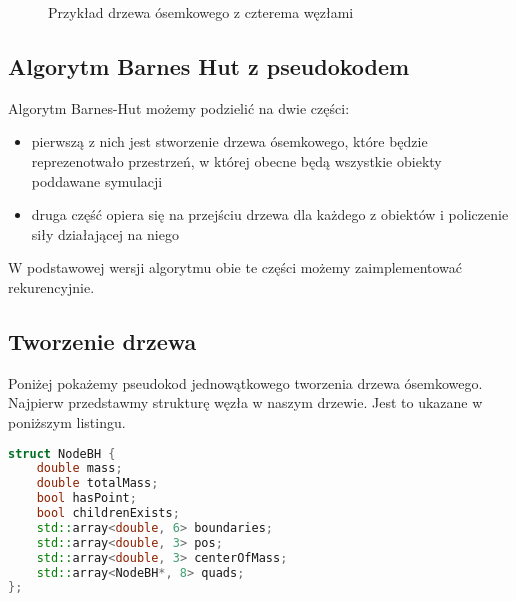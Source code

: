 \documentclass[14pt,twoside,a4paper]{article}
\theoremstyle{definition}
\begin{document}
\begin{figure}
    \centering
    \def\svgwidth{\columnwidth}
    
    \caption{Przykład drzewa ósemkowego z czterema węzłami}
\end{figure}

\subsection{\Large Algorytm Barnes Hut z pseudokodem}
Algorytm Barnes-Hut możemy podzielić na dwie części:
\begin{itemize}
  \item pierwszą z nich jest stworzenie drzewa ósemkowego, które będzie reprezenotwało przestrzeń, w której obecne będą wszystkie obiekty poddawane symulacji
  \item druga część opiera się na przejściu drzewa dla każdego z obiektów i policzenie siły działającej na niego
\end{itemize}
W podstawowej wersji algorytmu obie te części możemy zaimplementować rekurencyjnie.

\subsection{\Large Tworzenie drzewa}
Poniżej pokażemy pseudokod jednowątkowego tworzenia drzewa ósemkowego. Najpierw przedstawmy strukturę węzła w naszym drzewie. Jest to ukazane w poniższym listingu.

\begin{lstlisting}[language=C++, frame=single, framerule=2pt, caption=Struktura węzła w drzewie ósemkowym]
struct NodeBH {
    double mass;
    double totalMass;
    bool hasPoint;
    bool childrenExists;
    std::array<double, 6> boundaries;
    std::array<double, 3> pos;
    std::array<double, 3> centerOfMass;
    std::array<NodeBH*, 8> quads;
};
\end{lstlisting}
\end{document}
